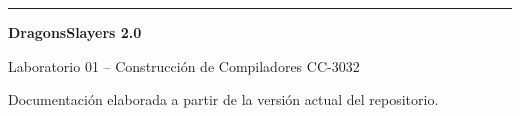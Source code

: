 \documentclass[12pt,letterpaper,oneside]{report}
\begin{document}
\vfill
\begin{center}
\color{uvgblue}\rule{0.75\textwidth}{0.8pt}\color{black}

\textbf{DragonsSlayers 2.0}\par
Laboratorio 01 -- Construcción de Compiladores CC-3032\par
Documentación elaborada a partir de la versión actual del repositorio.
\end{center}
\end{document}
